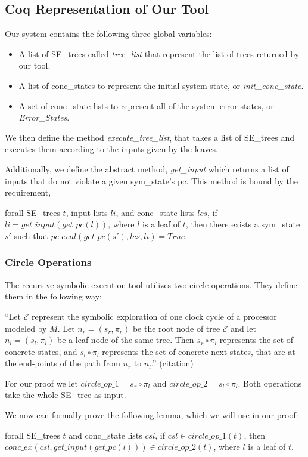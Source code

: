 \subsection{Coq Representation of Our Tool}
Our system contains the following three global variables:
\begin{itemize}
\item A list of SE\_trees called \textit{tree\_list} that represent the list of trees returned by our tool.
\item A list of conc\_states to represent the initial system state, or \textit{init\_conc\_state}.
\item A set of conc\_state lists to represent all of the system error states, or \textit{Error\_States}.
\end{itemize}

We then define the method \textit{execute\_tree\_list}, that takes a list of SE\_trees and executes them according to the inputs given by the leaves.

Additionally, we define the abstract method, \textit{get\_input} which returns a list of inputs that do not violate a given sym\_state's pc.
This method is bound by the requirement,
\begin{axiom}
forall SE\_trees $t$, input lists $li$, and conc\_state lists $lcs$,  
if $li = get\_input (get\_pc (l)) $, where $l$ is a leaf of $t$,
then there exists a sym\_state $s'$ such that
 $pc\_eval (get\_pc (s'), lcs, li) = True$.
\end{axiom}

\subsubsection{Circle Operations}
The recursive symbolic execution tool utilizes two circle operations. 
They define them in the following way: 

``Let $\mathcal{E}$ represent the symbolic exploration of one clock cycle of a processor modeled by $M$. Let $n_r = (s_r,\pi_r)$ be the root node of tree $\mathcal{E}$ and let $n_l = (s_l,\pi_l)$ be a leaf node of the same tree. 
Then $s_r \circ \pi_l$ represents the set of concrete states, and $s_l \circ \pi_l$ represents the set of concrete next-states, that are at the end-points of the path from $n_r$ to $n_l$.'' (citation)

For our proof we let $circle\_op\_1 =  s_r \circ \pi_l$ and $circle\_op\_2 =  s_l \circ \pi_l$.
Both operations take the whole SE\_tree as input.

We now can formally prove the following lemma, which we will use in our proof:
\begin{lemma} \label{cop}
forall SE\_trees $t$ and conc\_state lists $csl$,
if $csl \in circle\_op\_1(t)$,
then 
$conc\_ex(csl, get\_input (get\_pc (l))) \in circle\_op\_2(t)$,
where $l$ is a leaf of $t$.
\end{lemma}


